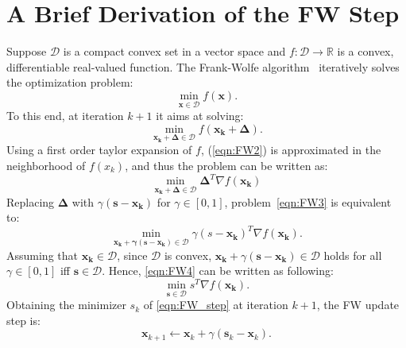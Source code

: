 \documentclass[dvipsnames,table,xcdraw]{article}
\newcommand{\bDelta}{\bm{\Delta}}
\newcommand{\bs}{\bm{s}}
\begin{document}
\section{A Brief Derivation of the FW Step}
Suppose $\mathcal{D}$ is a compact convex set in a vector space and $f \colon \mathcal{D} \to \mathbb{R}$ is a convex, differentiable real-valued function. The Frank-Wolfe algorithm~\cite{frank_wolfe} iteratively solves the optimization problem:
\begin{equation}
    \label{eqn:FW}
    \min_{\mathbf{x} \in \mathcal{D}}f(\mathbf{x}).
\end{equation}
To this end, at iteration $k+1$ it aims at solving:
\begin{equation}
    \label{eqn:FW2}
    \min_{\mathbf{x_k+\bDelta} \in \mathcal{D}}f(\mathbf{x_k+\bDelta}).
\end{equation}
Using a first order taylor expansion of $f$, (\ref{eqn:FW2}) is approximated in the neighborhood of $f(x_k)$, and thus the problem can be written as:
\begin{equation}
    \label{eqn:FW3}
    \min_{\mathbf{x_k+\bDelta} \in \mathcal{D}}\bDelta^T\nabla f(\mathbf{x_k})
\end{equation}
Replacing $\bDelta$ with $\gamma (\bs-\mathbf{x_k})$ for $\gamma\in [0,1]$, problem~\eqref{eqn:FW3} is equivalent to:
\begin{equation}
    \label{eqn:FW4}
    \min_{\mathbf{\mathbf{x_k}+\gamma (\bs-\mathbf{x_k})} \in \mathcal{D}}\gamma (s-\mathbf{x_k})^T\nabla f(\mathbf{x_k}).
\end{equation}
Assuming that $\mathbf{x_k} \in \mathcal{D}$, since $\mathcal{D}$ is convex,  $\mathbf{x_k}+\gamma (\bs-\mathbf{x_k}) \in \mathcal{D}$ holds for all $\gamma\in[0,1]$ iff
$\bs\in \mathcal{D}$. Hence, \eqref{eqn:FW4} can be written as following:
\begin{equation}
    \label{eqn:FW_step}
    \min_{\mathbf{s} \in \mathcal{D}}s^T\nabla f(\mathbf{x_k}).
\end{equation}
Obtaining the minimizer $s_k$ of \eqref{eqn:FW_step} at iteration $k+1$, the FW update step is:
\begin{equation}
\label{eqn:FW_update}
\mathbf{x}_{k+1}\leftarrow \mathbf{x}_k+\gamma(\mathbf{s}_k-\mathbf{x}_k).
\end{equation}
\end{document}
